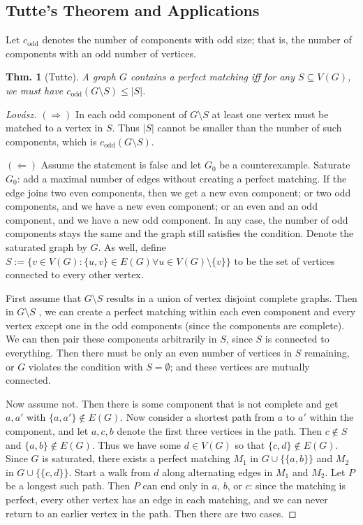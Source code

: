 \documentclass[12pt, a4paper]{book}
\newtheorem{theorem}{Thm.}[section]
\theoremstyle{nonumberplain}
\newtheorem{proof}{Proof}
\begin{document}
\subsection{Tutte's Theorem and Applications}
Let $c_{\text{odd}}$ denotes the number of components with odd size; that is, the number of components with an odd number of vertices.
\begin{theorem}[Tutte]
    A graph $G$ contains a perfect matching iff for any $S\subseteq V(G)$, we must have $c_{\text{odd}}(G\setminus S)\leq |S|$.
\end{theorem}
\begin{proof}[Lov\'asz]
    $(\Rightarrow)$ In each odd component of $G\setminus S$ at least one vertex must be matched to a vertex in $S$.
    Thus $|S|$ cannot be smaller than the number of such components, which is $c_{\text{odd}}(G\setminus S)$.

    $(\Leftarrow)$ Assume the statement is false and let $G_0$ be a counterexample.
    Saturate $G_0$: add a maximal number of edges without creating a perfect matching.
    If the edge joins two even components, then we get a new even component; or two odd components, and we have a new even component; or an even and an odd component, and we have a new odd component.
    In any case, the number of odd components stays the same and the graph still satisfies the condition.
    Denote the saturated graph by $G$.
    As well, define $S:=\{v\in V(G):\{u,v\}\in E(G)\forall u\in V(G)\setminus\{v\}\}$ to be the set of vertices connected to every other vertex.

    First assume that $G\setminus S$ results in a union of vertex disjoint complete graphs.
    Then in $G\setminus S$ , we can create a perfect matching within each even component and every vertex except one in the odd components (since the components are complete).
    We can then pair these components arbitrarily in $S$, since $S$ is connected to everything.
    Then there must be only an even number of vertices in $S$ remaining, or $G$ violates the condition with $S=\emptyset$; and these vertices are mutually connected.

    Now assume not.
    Then there is some component that is not complete and get $a,a'$ with $\{a,a'\}\notin E(G)$.
    Now consider a shortest path from $a$ to $a'$ within the component, and let $a,c,b$ denote the first three vertices in the path.
    Then $c\notin S$ and $\{a,b\}\notin E(G)$.
    Thus we have some $d\in V(G)$ so that $\{c,d\}\notin E(G)$.
    Since $G$ is saturated, there exists a perfect matching $M_1$ in $G\cup\{\{a,b\}\}$ and $M_2$ in $G\cup\{\{c,d\}\}$.
    Start a walk from $d$ along alternating edges in $M_1$ and $M_2$.
    Let $P$ be a longest such path.
    Then $P$ can end only in $a$, $b$, or $c$: since the matching is perfect, every other vertex has an edge in each matching, and we can never return to an earlier vertex in the path.
    Then there are two cases.


\end{proof}
\end{document}
